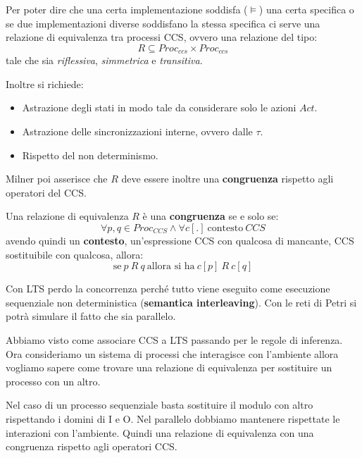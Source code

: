 Per poter dire che una certa implementazione soddisfa ($\models$) una certa
specifica o se due implementazioni diverse soddisfano la stessa specifica ci
serve una relazione di equivalenza tra processi CCS, ovvero una relazione del
tipo:
\begin{equation}
    R \subseteq Proc_{ccs} \times Proc_{ccs}
\end{equation}
tale che sia \textit{riflessiva}, \textit{simmetrica} e \textit{transitiva}.

Inoltre si richiede:
\begin{itemize}
    \item Astrazione degli stati in modo tale da considerare solo le azioni $Act$.
    \item Astrazione delle sincronizzazioni interne, ovvero dalle $\tau$.
    \item Rispetto del non determinismo.
\end{itemize}
Milner poi asserisce che $R$ deve essere inoltre una \textbf{congruenza} rispetto
agli operatori del CCS.
\begin{definizione}
    Una relazione di equivalenza $R$ è una \textbf{congruenza} se e solo se:
    \begin{equation}
        \forall p, q \in Proc_{CCS} \land \forall c[.] \ \text{contesto} \ CCS
    \end{equation}
    avendo quindi un \textbf{contesto}, un'espressione CCS con qualcosa di mancante,
    CCS sostituibile con qualcosa, allora:
    \begin{equation}
        \text{se} \ p\ R\ q \ \text{allora si ha} \ c[p] \ R \ c[q]
    \end{equation}
\end{definizione}
Con LTS perdo la concorrenza perché tutto viene eseguito come esecuzione
sequenziale non deterministica (\textbf{semantica interleaving}). Con le reti di
Petri si potrà simulare il fatto che sia parallelo.

Abbiamo visto come associare CCS a LTS passando per le regole di inferenza.
Ora consideriamo un sistema di processi che interagisce con l'ambiente allora
vogliamo sapere come trovare una relazione di equivalenza per sostituire un
processo con un altro.

Nel caso di un processo sequenziale basta sostituire il modulo con altro
rispettando i domini di I e O. Nel parallelo dobbiamo mantenere rispettate
le interazioni con l'ambiente. Quindi una relazione di equivalenza con una
congruenza rispetto agli operatori CCS.


